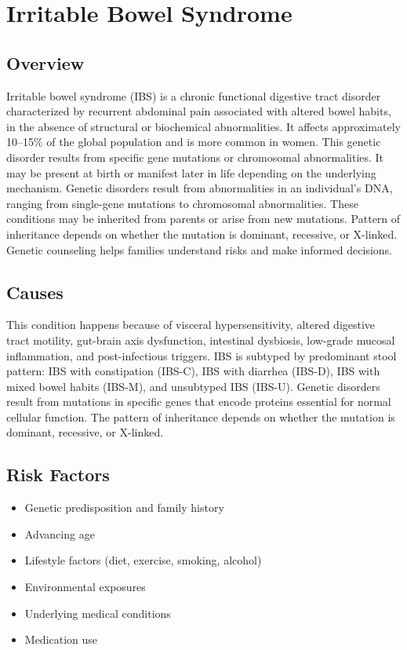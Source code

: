 \chapter{Irritable Bowel Syndrome}
\label{sec:Irritable Bowel Syndrome}

\section{Overview}
Irritable bowel syndrome (IBS) is a chronic functional digestive tract disorder characterized by recurrent abdominal pain associated with altered bowel habits, in the absence of structural or biochemical abnormalities. It affects approximately 10--15\% of the global population and is more common in women. This genetic disorder results from specific gene mutations or chromosomal abnormalities. It may be present at birth or manifest later in life depending on the underlying mechanism. Genetic disorders result from abnormalities in an individual's DNA, ranging from single-gene mutations to chromosomal abnormalities. These conditions may be inherited from parents or arise from new mutations. Pattern of inheritance depends on whether the mutation is dominant, recessive, or X-linked. Genetic counseling helps families understand risks and make informed decisions.
\section{Causes}
This condition happens because of visceral hypersensitivity, altered digestive tract motility, gut-brain axis dysfunction, intestinal dysbiosis, low-grade mucosal inflammation, and post-infectious triggers. IBS is subtyped by predominant stool pattern: IBS with constipation (IBS-C), IBS with diarrhea (IBS-D), IBS with mixed bowel habits (IBS-M), and unsubtyped IBS (IBS-U). Genetic disorders result from mutations in specific genes that encode proteins essential for normal cellular function. The pattern of inheritance depends on whether the mutation is dominant, recessive, or X-linked.   
\section{Risk Factors}

\begin{itemize}[noitemsep]
  \item Genetic predisposition and family history
  \item Advancing age
  \item Lifestyle factors (diet, exercise, smoking, alcohol)
  \item Environmental exposures
  \item Underlying medical conditions
  \item Medication use
\end{itemize}

